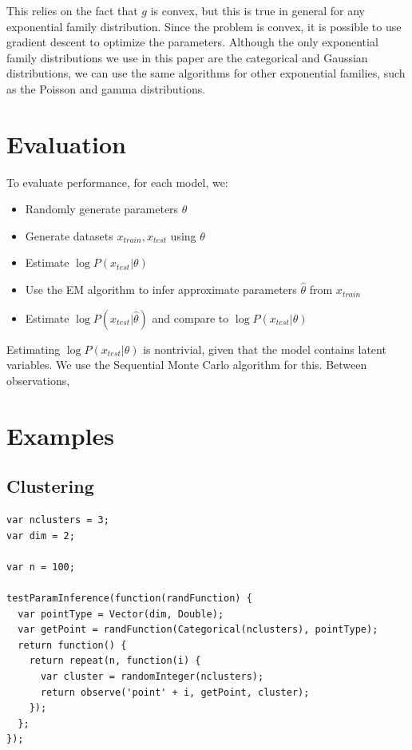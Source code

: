 \documentclass{article}
\begin{document}
    This relies on the fact that $g$ is convex, but this is true in general for any exponential family distribution.
    Since the problem is convex, it is possible to use gradient descent to optimize the parameters.  Although
    the only exponential family distributions we use in this paper are the categorical and Gaussian distributions,
    we can use the same algorithms for other exponential families, such as the Poisson and gamma distributions.

  \section{Evaluation}

    To evaluate performance, for each model, we:
    \begin{itemize}
      \item
        Randomly generate parameters $\theta$
      \item
        Generate datasets $x_{train}, x_{test}$ using $\theta$
      \item
        Estimate $\log P(x_{test} | \theta)$
      \item
        Use the EM algorithm to infer approximate parameters $\hat{\theta}$ from $x_{train}$
      \item
        Estimate $\log P(x_{test} | \hat{\theta})$ and compare to $\log P(x_{test} | \theta)$
    \end{itemize}
    Estimating $\log P(x_{test} | \theta)$ is nontrivial, given that the model contains latent variables.
    We use the Sequential Monte Carlo algorithm for this.  Between observations,


  \section{Examples}

  \subsection{Clustering}
{\small
\begin{verbatim}
var nclusters = 3;
var dim = 2;

var n = 100;

testParamInference(function(randFunction) {
  var pointType = Vector(dim, Double);
  var getPoint = randFunction(Categorical(nclusters), pointType);
  return function() {
    return repeat(n, function(i) {
      var cluster = randomInteger(nclusters);
      return observe('point' + i, getPoint, cluster);
    });
  };
});
\end{verbatim}
}
\end{document}
